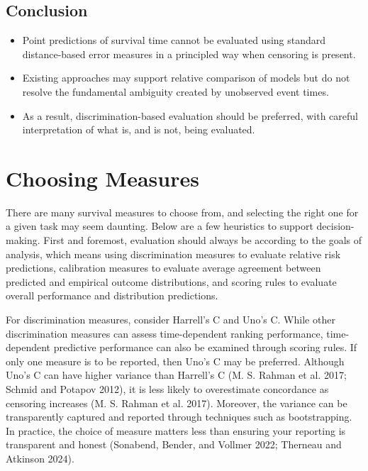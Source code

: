 \documentclass[
  letterpaper,
  krantz2]{style/krantz}
\providecommand{\tightlist}{%
  \setlength{\itemsep}{0pt}\setlength{\parskip}{0pt}}
\begin{document}
\section{Conclusion}\label{conclusion-7}

\begin{tcolorbox}[enhanced jigsaw, toprule=.15mm, bottomtitle=1mm, opacityback=0, breakable, leftrule=.75mm, title={Key takeaways}, toptitle=1mm, bottomrule=.15mm, colback=white, colframe=quarto-callout-warning-color-frame, titlerule=0mm, opacitybacktitle=0.6, coltitle=black, rightrule=.15mm, left=2mm, colbacktitle=quarto-callout-warning-color!10!white, arc=.35mm]

\begin{itemize}
\tightlist
\item
  Point predictions of survival time cannot be evaluated using standard
  distance-based error measures in a principled way when censoring is
  present.
\item
  Existing approaches may support relative comparison of models but do
  not resolve the fundamental ambiguity created by unobserved event
  times.
\item
  As a result, discrimination-based evaluation should be preferred, with
  careful interpretation of what is, and is not, being evaluated.
\end{itemize}

\end{tcolorbox}

\chapter{Choosing Measures}\label{sec-choosing-measures}

There are many survival measures to choose
from, and selecting the right one for a given task may seem daunting.
Below are a few heuristics to support decision-making. First and
foremost, evaluation should always be according to the goals of
analysis, which means using discrimination
measures to evaluate relative risk
predictions, calibration
measures to evaluate average agreement between predicted and empirical
outcome distributions, and scoring rules to
evaluate overall performance and distribution predictions.

For discrimination measures, consider Harrell's C and Uno's
C.
While other discrimination measures can assess time-dependent ranking
performance, time-dependent predictive performance can also be examined
through scoring rules. If only one measure is to be reported, then Uno's
C may be preferred. Although Uno's C can have higher variance than
Harrell's C (M. S. Rahman et al. 2017; Schmid and Potapov 2012), it is
less likely to overestimate concordance as censoring increases (M. S.
Rahman et al. 2017). Moreover, the variance can be transparently
captured and reported through techniques such as bootstrapping. In
practice, the choice of measure matters less than ensuring your
reporting is transparent and honest (Sonabend, Bender, and Vollmer 2022;
Therneau and Atkinson 2024).
\end{document}

